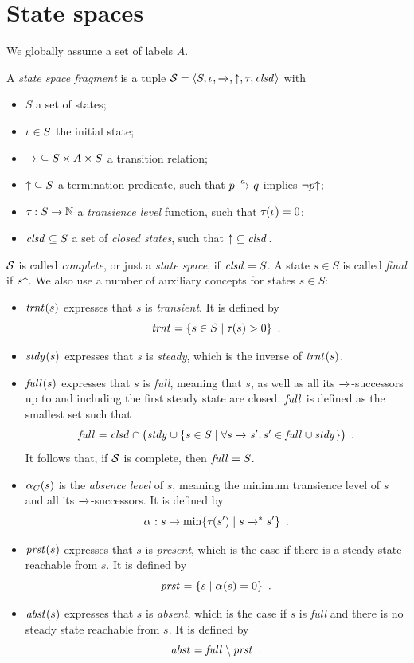 \documentclass{article}
\begin{document}
\section*{State spaces}

\medskip\noindent
We globally assume a set of labels $A$.

\medskip\noindent 
A \emph{state space fragment} is a tuple $\cS=\tupof{S,\Init,{\trans{}},{\final},\TLevel,\Closed}$ with
\begin{itemize}
\item $S$ a set of states;
\item $\Init\in S$ the initial state;
\item ${\trans{}}\subseteq S\times A\times S$ a transition relation;
\item ${\final}\subseteq S$ a termination predicate, such that $p\trans a q$ implies $\neg p\final$;
\item ${\TLevel}:S\to \natN$ a \emph{transience level} function, such that $\TLevel(\Init)=0$;
\item $\Closed\subseteq S$ a set of \emph{closed states}, such that $\final\subseteq \Closed$.
\end{itemize}
%
$\cS$ is called \emph{complete}, or just a \emph{state space}, if $\Closed=S$. A state $s\in S$ is called \emph{final} if $s\final$. We also use a number of auxiliary concepts for states $s\in S$:

\begin{itemize}
\item $\Transient(s)$ expresses that $s$ is \emph{transient}. It is defined by
%
\[ \Transient = \gensetof{s\in S}{\TLevel(s)>0} \enspace. \]

\item $\Steady(s)$ expresses that $s$ is \emph{steady}, which is the inverse of $\Transient(s)$.

\item $\Full(s)$ expresses that $s$ is \emph{full}, meaning that $s$, as well as all its $\trans{}$-successors up to and including the first steady state are closed. $\Full$ is defined as the smallest set such that
%
\[ \Full = \Closed\cap \bigl(\Steady \cup \gensetof{s\in S}{\forall s\trans{} s'.\, s'\in \Full\cup \Steady}\bigr) \enspace.
\]
It follows that, if $\cS$ is complete, then $\Full=S$.

\item $\ALevel[C](s)$ is the \emph{absence level} of $s$, meaning the minimum transience level of $s$ and all its $\trans{}$-successors. It is defined by
%
\[ \ALevel: s\mapsto \min\gensetof{\TLevel(s')}{s\trans{}^* s'} \enspace. \]

\item $\Present(s)$ expresses that $s$ is \emph{present}, which is the case if there is a steady state reachable from $s$. It is defined by
%
\[ \Present = \gensetof{s}{\ALevel(s)=0} \enspace. \]

\item $\Absent(s)$ expresses that $s$ is \emph{absent}, which is the case if $s$ is \emph{full} and there is no steady state reachable from $s$. It is defined by
%
\[ \Absent= \Full \setminus \Present \enspace. \]
\end{itemize}
\end{document}
